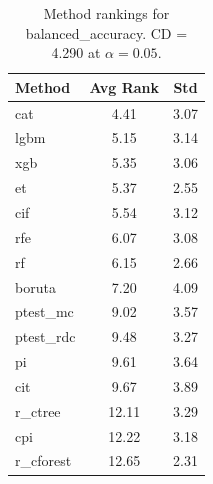 \begin{table}[h]
\centering
\caption{Method rankings for balanced_accuracy. CD = 4.290 at $\alpha=0.05$.}
\label{tab:ranks_balanced_accuracy}
\begin{tabular}{lcc}
\toprule
Method & Avg Rank & Std \\
\midrule
cat & 4.41 & 3.07 \\
lgbm & 5.15 & 3.14 \\
xgb & 5.35 & 3.06 \\
et & 5.37 & 2.55 \\
cif & 5.54 & 3.12 \\
rfe & 6.07 & 3.08 \\
rf & 6.15 & 2.66 \\
boruta & 7.20 & 4.09 \\
ptest_mc & 9.02 & 3.57 \\
ptest_rdc & 9.48 & 3.27 \\
pi & 9.61 & 3.64 \\
cit & 9.67 & 3.89 \\
r_ctree & 12.11 & 3.29 \\
cpi & 12.22 & 3.18 \\
r_cforest & 12.65 & 2.31 \\
\bottomrule
\end{tabular}
\end{table}